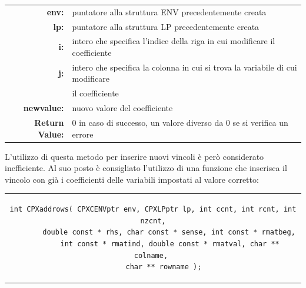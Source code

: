 \begin{table}[h]
\centering
\begin{tabular}{rl}
\textbf{env:} & {puntatore alla struttura ENV precedentemente creata}\\
\textbf{lp:} & {puntatore alla struttura LP precedentemente creata}\\
\textbf{i:} & {intero che specifica l'indice della riga in cui modificare il coefficiente}\\
\textbf{j:} & {intero che specifica la colonna in cui si trova la variabile di cui modificare}\\
&{il coefficiente}\\
\textbf{newvalue:} & {nuovo valore del coefficiente}\\
\textbf{Return Value:} & {0 in caso di successo, un valore diverso da 0 se si verifica un errore}\\
\end{tabular}
\end{table}
L'utilizzo di questa metodo per inserire nuovi vincoli è però considerato inefficiente. Al suo posto è consigliato l'utilizzo di una funzione che inserisca il vincolo con già i coefficienti delle variabili impostati al valore corretto:
\begin{center}
\begin{tabular}{c}
\begin{lstlisting}[linewidth=400pt, basicstyle=\footnotesize\sffamily,]  
int CPXaddrows( CPXCENVptr env, CPXLPptr lp, int ccnt, int rcnt, int nzcnt,
		double const * rhs, char const * sense, int const * rmatbeg, 
		int const * rmatind, double const * rmatval, char ** colname, 
		char ** rowname );   
\end{lstlisting}
\end{tabular}
\end{center}
